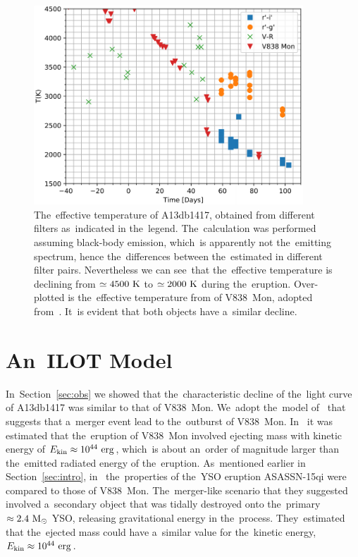 \documentclass[galaxies,article,accept,moreauthors,pdftex]{mdpi}
\def \K{~\rm{K}}
\def \erg{~\rm{erg}}
\def \sun{\odot}
\def \rmModot{~\rm{M_{\sun}}}
\begin{document}
\begin{figure}[t]
\centering
\includegraphics[trim= 0.0cm 0.0cm 0.0cm 0.0cm,clip=true,width=0.9\textwidth]{T-JD-V838} %
\caption{The~effective temperature of A13db1417, obtained from different filters as~indicated in the~legend. The~calculation was performed assuming black-body emission, which~is apparently not the~emitting spectrum, hence the~differences between the~estimated in different filter pairs.
Nevertheless we can see~that the~effective temperature is declining from $\simeq 4500\K$ to $\simeq 2000\K$ during the~eruption. Over-plotted is the~effective temperature from of V838~Mon, adopted from~\citep{Tylenda2005}. It~is evident that both objects have a~similar decline. }
\label{fig:Tt}
\end{figure}



\section{An~ILOT Model}
\label{sec:model}

In~Section~\ref{sec:obs} we showed that the~characteristic decline of the~light curve of A13db1417 was similar to that of  V838~Mon. We~adopt the~model of~\cite{SokerTylenda2006} that suggests that a~merger event lead to the~outburst of V838~Mon. In~\cite{SokerTylenda2006} it was estimated that the~eruption of V838~Mon involved ejecting mass with kinetic energy of $E_{\rm kin} \approx 10^{44} \erg$, which~is about an~order of magnitude larger than the~emitted radiated energy of the~eruption. As~mentioned earlier in Section~\ref{sec:intro}, in~\cite{KashiSoker2017} the~properties of the~YSO eruption ASASSN-15qi were compared to those of V838~Mon. The~merger-like scenario that they suggested involved a~secondary object that was tidally destroyed onto the~primary $\approx 2.4 \rmModot$ YSO, releasing gravitational energy in the~process.
They~estimated that the~ejected mass could have a~similar value for the~kinetic energy, $E_{\rm kin} \approx 10^{44} \erg$.
\end{document}
